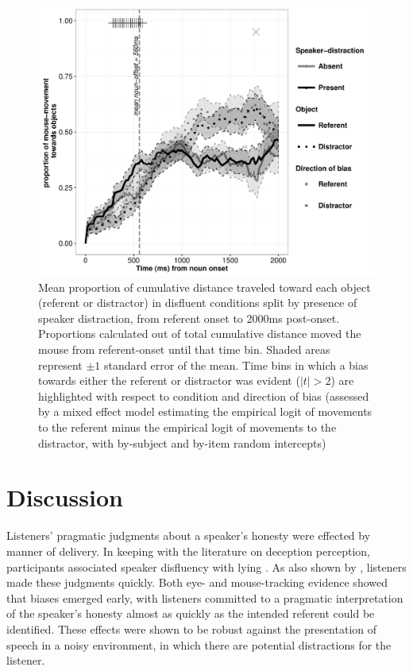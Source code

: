 \documentclass[a4paper,man,natbib]{apa6}
\begin{document}
\begin{figure}[Ht]
  \centering
	\includegraphics[width=\linewidth]{mouse_disf.pdf}
  \caption{Mean proportion of cumulative distance traveled toward each object (referent or distractor) in disfluent conditions split by presence of speaker distraction, from referent onset to 2000ms post-onset. Proportions calculated out of total cumulative distance moved the mouse from referent-onset until that time bin. Shaded areas represent $\pm 1$ standard error of the mean. Time bins in which a bias towards either the referent or distractor was evident ($|t|>2$) are highlighted with respect to condition and direction of bias (assessed by a mixed effect model estimating the empirical logit of movements to the referent minus the empirical logit of movements to the distractor, with by-subject and by-item random intercepts)}
  \label{fig:mdis}
\end{figure}


\section{Discussion}
Listeners' pragmatic judgments about a speaker's honesty were effected by manner of delivery.
In keeping with the literature on deception perception, participants associated speaker disfluency with lying \citep{Zuckerman1981,depaulo2003cues}. 
As also shown by \citet{Loy2016}, listeners made these judgments quickly.
Both eye- and mouse-tracking evidence showed that biases emerged early, with listeners committed to a pragmatic interpretation of the speaker's honesty almost as quickly as the intended referent could be identified.
These effects were shown to be robust against the presentation of speech in a noisy environment, in which there are potential distractions for the listener.
\end{document}
